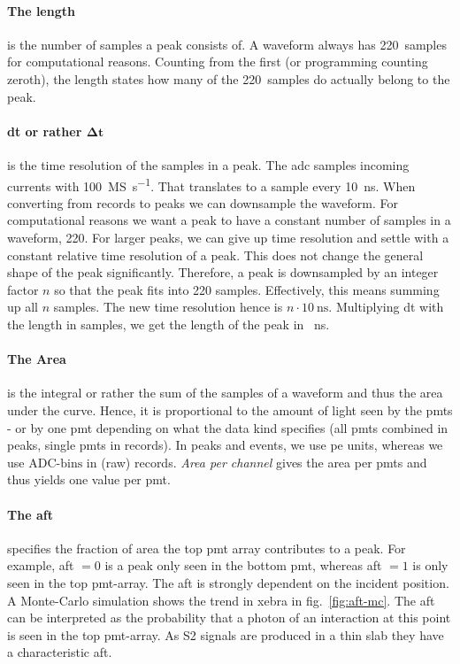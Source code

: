 \paragraph{The length} is the number of samples a peak consists of.
A waveform always has \SI{220}{samples} for computational reasons.
Counting from the first (or programming counting zeroth), the length states how many of the \SI{220}{samples} do actually belong to the peak.

\paragraph{dt or rather $ \mathbf{\Delta t}$} is the time resolution of the samples in a peak.
The \gls{adc} samples incoming currents with \SI{100}{\mega S\per\second}.
That translates to a sample every \SI{10}{\nano\second}.
When converting from records to peaks we can downsample the waveform.
For computational reasons we want a peak to have a constant number of samples in a waveform, 220.
For larger peaks, we can give up time resolution and settle with a constant relative time resolution of a peak.
This does not change the general shape of the peak significantly.
Therefore, a peak is downsampled by an integer factor $ n $ so that the peak fits into 220 samples.
Effectively, this means summing up all $ n $ samples.
The new time resolution hence is $ n \cdot \SI{10}{\nano\second} $.
Multiplying dt with the length in samples, we get the length of the peak in \SI{}{\nano\second}.

\paragraph{The Area} is the integral or rather the sum of the samples of a waveform and thus the area under the curve.
Hence, it is proportional to the amount of light seen by the \glspl{pmt} - or by one \gls{pmt} depending on what the data kind specifies (all \glspl{pmt} combined in peaks, single \glspl{pmt} in records).
In peaks and events, we use \gls{pe} units, whereas we use $ \mathrm{ADC\mbox{-}bins} $ in (raw) records.
\emph{Area per channel} gives the area per \glspl{pmt} and thus yields one value per \gls{pmt}.

\paragraph{The \gls{aft}} specifies the fraction of area the top \gls{pmt} array contributes to a peak.
For example, \gls{aft} $ = 0 $ is a peak only seen in the bottom \gls{pmt}, whereas \gls{aft} $ = 1 $ is only seen in the top \gls{pmt}-array.
The \gls{aft} is strongly dependent on the incident position.
A Monte-Carlo simulation shows the trend in \gls{xebra} in fig.~\ref{fig:aft-mc}.
The \gls{aft} can be interpreted as the probability that a photon of an interaction at this point is seen in the top \gls{pmt}-array.
As S2 signals are produced in a thin slab they have a characteristic \gls{aft}.

